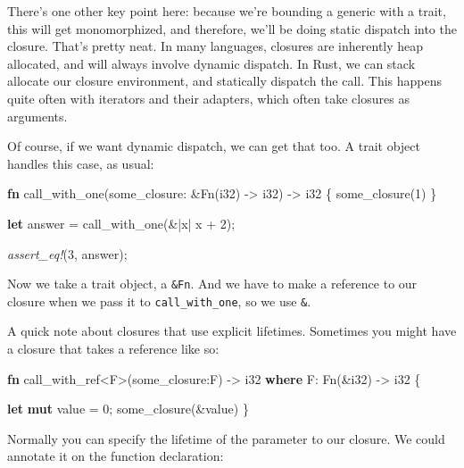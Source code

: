 \documentclass[a4paper,]{book}
\newenvironment{Shaded}{\begin{snugshade}}{\end{snugshade}}
\newcommand{\KeywordTok}[1]{\textcolor[rgb]{0.13,0.29,0.53}{\textbf{{#1}}}}
\newcommand{\DataTypeTok}[1]{\textcolor[rgb]{0.13,0.29,0.53}{{#1}}}
\newcommand{\DecValTok}[1]{\textcolor[rgb]{0.00,0.00,0.81}{{#1}}}
\newcommand{\BuiltInTok}[1]{{#1}}
\newcommand{\PreprocessorTok}[1]{\textcolor[rgb]{0.56,0.35,0.01}{\textit{{#1}}}}
\newcommand{\NormalTok}[1]{{#1}}
\begin{document}
There's one other key point here: because we're bounding a generic with
a trait, this will get monomorphized, and therefore, we'll be doing
static dispatch into the closure. That's pretty neat. In many languages,
closures are inherently heap allocated, and will always involve dynamic
dispatch. In Rust, we can stack allocate our closure environment, and
statically dispatch the call. This happens quite often with iterators
and their adapters, which often take closures as arguments.

Of course, if we want dynamic dispatch, we can get that too. A trait
object handles this case, as usual:

\begin{Shaded}
\begin{Highlighting}[]
\KeywordTok{fn} \NormalTok{call_with_one(some_closure: &}\BuiltInTok{Fn}\NormalTok{(}\DataTypeTok{i32}\NormalTok{) -> }\DataTypeTok{i32}\NormalTok{) -> }\DataTypeTok{i32} \NormalTok{\{}
    \NormalTok{some_closure(}\DecValTok{1}\NormalTok{)}
\NormalTok{\}}

\KeywordTok{let} \NormalTok{answer = call_with_one(&|x| x + }\DecValTok{2}\NormalTok{);}

\PreprocessorTok{assert_eq!}\NormalTok{(}\DecValTok{3}\NormalTok{, answer);}
\end{Highlighting}
\end{Shaded}

Now we take a trait object, a \texttt{\&Fn}. And we have to make a
reference to our closure when we pass it to \texttt{call\_with\_one}, so
we use \texttt{\&\textbar{}\textbar{}}.

A quick note about closures that use explicit lifetimes. Sometimes you
might have a closure that takes a reference like so:

\begin{Shaded}
\begin{Highlighting}[]
\KeywordTok{fn} \NormalTok{call_with_ref<F>(some_closure:F) -> }\DataTypeTok{i32}
    \KeywordTok{where} \NormalTok{F: }\BuiltInTok{Fn}\NormalTok{(&}\DataTypeTok{i32}\NormalTok{) -> }\DataTypeTok{i32} \NormalTok{\{}

    \KeywordTok{let} \KeywordTok{mut} \NormalTok{value = }\DecValTok{0}\NormalTok{;}
    \NormalTok{some_closure(&value)}
\NormalTok{\}}
\end{Highlighting}
\end{Shaded}

Normally you can specify the lifetime of the parameter to our closure.
We could annotate it on the function declaration:
\end{document}
